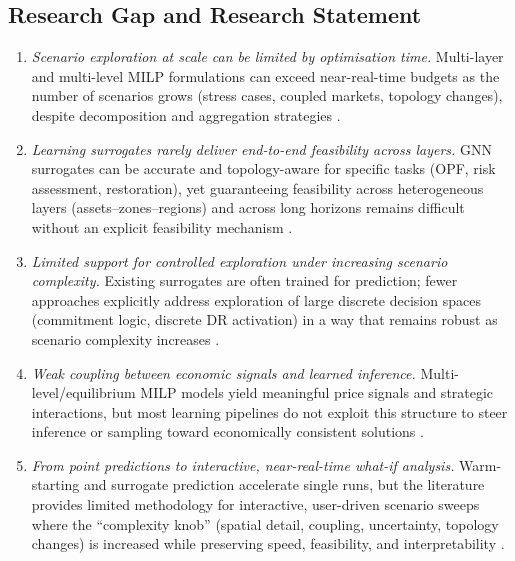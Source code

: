 \documentclass{article}
\let\parencite\citep
\begin{document}
\subsection{Research Gap and Research Statement}

\begin{enumerate}[label=\textbf{(\arabic*)}, leftmargin=*, itemsep=2pt]
  \item \emph{Scenario exploration at scale can be limited by optimisation time.} Multi-layer and multi-level MILP formulations can exceed near-real-time budgets as the number of scenarios grows (stress cases, coupled markets, topology changes), despite decomposition and aggregation strategies \parencite{micheli_two-stage_2023,pozo_three-level_2013,xia_scalable_2025,marquant_holarchic_2017}.
  \item \emph{Learning surrogates rarely deliver end-to-end feasibility across layers.} GNN surrogates can be accurate and topology-aware for specific tasks (OPF, risk assessment, restoration), yet guaranteeing feasibility across heterogeneous layers (assets--zones--regions) and across long horizons remains difficult without an explicit feasibility mechanism \parencite{liu_topology-aware_2023,zhang_graph_2024,ahmed_advancing_2024}.
  \item \emph{Limited support for controlled exploration under increasing scenario complexity.} Existing surrogates are often trained for prediction; fewer approaches explicitly address exploration of large discrete decision spaces (commitment logic, discrete DR activation) in a way that remains robust as scenario complexity increases \parencite{yang_solving_nodate,sun_annealed_2022,goshvadi_discs_2023}.
  \item \emph{Weak coupling between economic signals and learned inference.} Multi-level/equilibrium MILP models yield meaningful price signals and strategic interactions, but most learning pipelines do not exploit this structure to steer inference or sampling toward economically consistent solutions \parencite{hobbs_strategic_2000,pozo_three-level_2013,xia_scalable_2025}.
  \item \emph{From point predictions to interactive, near-real-time what-if analysis.} Warm-starting and surrogate prediction accelerate single runs, but the literature provides limited methodology for interactive, user-driven scenario sweeps where the ``complexity knob'' (spatial detail, coupling, uncertainty, topology changes) is increased while preserving speed, feasibility, and interpretability \parencite{deihim_initial_2024,pjetri_graph_nodate,talebi_graph_2025}.
\end{enumerate}
\end{document}

